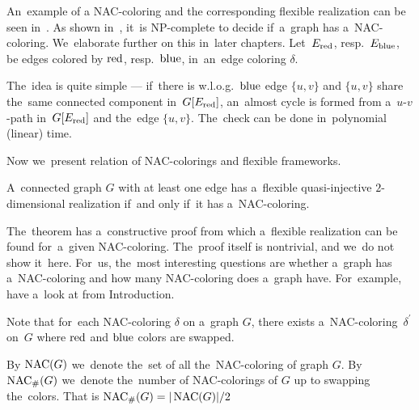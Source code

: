 An~example of a NAC-coloring and the corresponding flexible realization
can be seen in~.
%
As shown in~\cite{np_complete}, it~is NP-complete to decide if~a~graph has a~NAC-coloring.
We~elaborate further on this in~later chapters.
Let~\( E_{\text{red}}\), resp.\ \( E_{\text{blue}} \), be edges colored by \( \text{red} \), resp.~\( \text{blue} \),
in~an~edge coloring \( \delta \).
%
%
The~idea is quite simple --- if~there is w.l.o.g.\ \( \text{blue} \) edge \( \{u, v\} \)
and \( \{u, v\} \) share the~same connected component in~\( G[E_{\text{red}}] \),
an~almost cycle is formed from a~\( u \)-\( v \)-path in~\( G[E_{\text{red}}] \)
and the~edge \( \{u, v\} \).
The~check can be done in~polynomial (linear) time.

Now we~present relation of NAC-colorings and flexible frameworks.
%
\begin{theorem}
	A~connected graph \( G \) with at least one edge has a~flexible
	quasi-injective \( 2 \)-dimensional realization if~and only if~it has a~NAC-coloring.
\end{theorem}
%
The~theorem has a~constructive proof from which a~flexible realization
can be found for~a~given NAC-coloring.
The~proof itself is nontrivial, and we~do not show it~here.
For~us, the~most interesting questions are whether a~graph has a~NAC-coloring
and how many NAC-coloring does a~graph have.
For~example, have a~look at 
from Introduction.

Note that for~each NAC-coloring \( \delta \) on a~graph \( G \),
there exists a~NAC-coloring~\( \delta^\prime \) on~\( G \)
where \( \text{red} \) and \( \text{blue} \) colors are swapped.
%
\begin{definition}
	By \( \operatorname{NAC}(G) \) we~denote the~set of all the~NAC-coloring of graph \( G \).
	By \( \operatorname{NAC}_{\#} (G) \) we~denote the~number of NAC-colorings of \( G \)
	up to swapping the~colors.
	That is \( \operatorname{NAC}_{\#} (G) = | \operatorname{NAC}(G) | / 2 \)
\end{definition}
%

